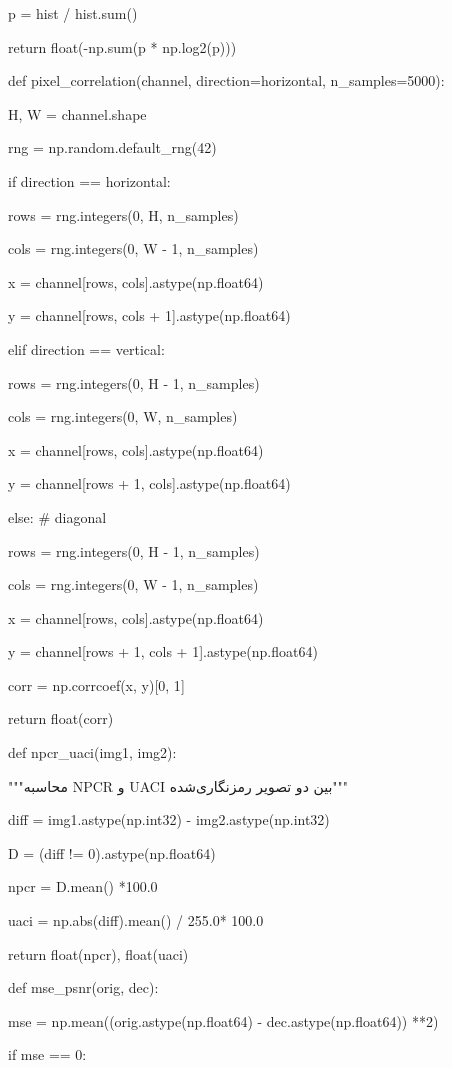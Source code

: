 p = hist / hist.sum()

return float(-np.sum(p * np.log2(p)))

def pixel\_correlation(channel, direction=\textquotesingle horizontal\textquotesingle, n\_samples=5000):

H, W = channel.shape

rng = np.random.default\_rng(42)

if direction == \textquotesingle horizontal\textquotesingle:

rows = rng.integers(0, H, n\_samples)

cols = rng.integers(0, W - 1, n\_samples)

x = channel{[}rows, cols{]}.astype(np.float64)

y = channel{[}rows, cols + 1{]}.astype(np.float64)

elif direction == \textquotesingle vertical\textquotesingle:

rows = rng.integers(0, H - 1, n\_samples)

cols = rng.integers(0, W, n\_samples)

x = channel{[}rows, cols{]}.astype(np.float64)

y = channel{[}rows + 1, cols{]}.astype(np.float64)

else: \# diagonal

rows = rng.integers(0, H - 1, n\_samples)

cols = rng.integers(0, W - 1, n\_samples)

x = channel{[}rows, cols{]}.astype(np.float64)

y = channel{[}rows + 1, cols + 1{]}.astype(np.float64)

corr = np.corrcoef(x, y){[}0, 1{]}

return float(corr)

def npcr\_uaci(img1, img2):

"""محاسبه NPCR و UACI بین دو تصویر رمزنگاری‌شده"""

diff = img1.astype(np.int32) - img2.astype(np.int32)

D = (diff != 0).astype(np.float64)

npcr = D.mean() *100.0

uaci = np.abs(diff).mean() / 255.0* 100.0

return float(npcr), float(uaci)

def mse\_psnr(orig, dec):

mse = np.mean((orig.astype(np.float64) - dec.astype(np.float64)) **2)

if mse == 0:

